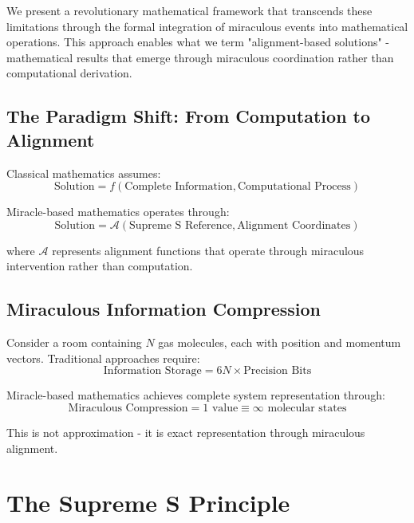 \documentclass[11pt]{article}
\begin{document}
We present a revolutionary mathematical framework that transcends these limitations through the formal integration of miraculous events into mathematical operations. This approach enables what we term "alignment-based solutions" - mathematical results that emerge through miraculous coordination rather than computational derivation.

\subsection{The Paradigm Shift: From Computation to Alignment}

Classical mathematics assumes:
\begin{equation}
\text{Solution} = f(\text{Complete Information}, \text{Computational Process})
\label{eq:classical_paradigm}
\end{equation}

Miracle-based mathematics operates through:
\begin{equation}
\text{Solution} = \mathcal{A}(\text{Supreme S Reference}, \text{Alignment Coordinates})
\label{eq:miraculous_paradigm}
\end{equation}

where $\mathcal{A}$ represents alignment functions that operate through miraculous intervention rather than computation.

\subsection{Miraculous Information Compression}

Consider a room containing $N$ gas molecules, each with position and momentum vectors. Traditional approaches require:
\begin{equation}
\text{Information Storage} = 6N \times \text{Precision Bits}
\label{eq:traditional_storage}
\end{equation}

Miracle-based mathematics achieves complete system representation through:
\begin{equation}
\text{Miraculous Compression} = 1 \text{ value} \equiv \infty \text{ molecular states}
\label{eq:miraculous_compression}
\end{equation}

This is not approximation - it is exact representation through miraculous alignment.

\section{The Supreme S Principle}
\end{document}

